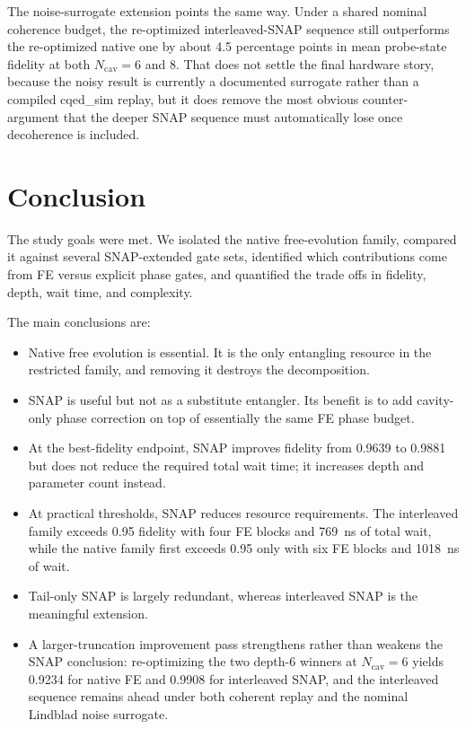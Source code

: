 \documentclass[aps,pra,twocolumn,reprint,amsmath,amssymb]{revtex4-2}
\begin{document}
The noise-surrogate extension points the same way. Under a shared nominal
coherence budget, the re-optimized interleaved-SNAP sequence still outperforms
the re-optimized native one by about 4.5 percentage points in mean probe-state
fidelity at both $N_{\mathrm{cav}}=6$ and 8. That does not settle the final
hardware story, because the noisy result is currently a documented surrogate
rather than a compiled cqed\_sim replay, but it does remove the most obvious
counter-argument that the deeper SNAP sequence must automatically lose once
decoherence is included.

\section{Conclusion}
The study goals were met. We isolated the native free-evolution family,
compared it against several SNAP-extended gate sets, identified which
contributions come from FE versus explicit phase gates, and quantified the trade
offs in fidelity, depth, wait time, and complexity.

The main conclusions are:
\begin{itemize}
  \item Native free evolution is essential. It is the only entangling resource
  in the restricted family, and removing it destroys the decomposition.
  \item SNAP is useful but not as a substitute entangler. Its benefit is to add
  cavity-only phase correction on top of essentially the same FE phase budget.
  \item At the best-fidelity endpoint, SNAP improves fidelity from 0.9639 to
  0.9881 but does not reduce the required total wait time; it increases depth
  and parameter count instead.
  \item At practical thresholds, SNAP reduces resource requirements. The
  interleaved family exceeds 0.95 fidelity with four FE blocks and
  \SI{769}{ns} of total wait, while the native family first exceeds 0.95 only
  with six FE blocks and \SI{1018}{ns} of wait.
  \item Tail-only SNAP is largely redundant, whereas interleaved SNAP is the
  meaningful extension.
  \item A larger-truncation improvement pass strengthens rather than weakens the
  SNAP conclusion: re-optimizing the two depth-6 winners at $N_{\mathrm{cav}}=6$
  yields 0.9234 for native FE and 0.9908 for interleaved SNAP, and the
  interleaved sequence remains ahead under both coherent replay and the nominal
  Lindblad noise surrogate.
\end{itemize}
\end{document}
